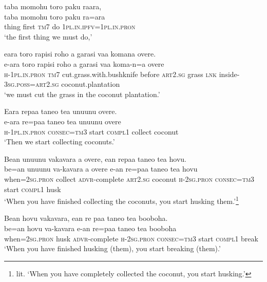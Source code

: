\ea\label{ex:text01-151}
taba momohu toro paku raara,\\
\gll taba	momohu	toro	paku	ra=ara\\
     thing	first	\textsc{tm}7	do	1\textsc{pl}.\textsc{in}.\textsc{ipfv}=1\textsc{pl}.\textsc{in}.\textsc{pron}\\
\glt `the first thing we must do,'
\z

\ea\label{ex:text01-152}
eara toro rapisi roho a garasi vaa komana overe.\\
\gll e-ara	toro	rapisi	roho	a	garasi	vaa	koma-n=a	overe\\
     \textsc{h}-1\textsc{pl}.\textsc{in}.\textsc{pron}	\textsc{tm}7	cut.grass.with.bushknife	before	\textsc{art}2.\textsc{sg}	grass	\textsc{lnk}	inside-3\textsc{sg}.\textsc{poss}=\textsc{art}2.\textsc{sg}	coconut.plantation\\
\glt `we must cut the grass in the coconut plantation.'
\z

\ea\label{ex:text01-153}
Eara repaa taneo tea unuunu overe.\\
\gll e-ara	re=paa	taneo	tea	unuunu	overe\\
     \textsc{h}-1\textsc{pl}.\textsc{in}.\textsc{pron}	\textsc{consec}=\textsc{tm}3	start	\textsc{compl}1	collect	coconut\\
\glt `Then we start collecting coconuts.'
\z

\ea\label{ex:text01-154}
Bean unuunu vakavara a overe, ean repaa taneo tea hovu.\\
\gll be=an	unuunu	va-kavara	a	overe	e-an	re=paa	taneo	tea	hovu\\
     when=2\textsc{sg}.\textsc{pron}	collect	\textsc{advr}-complete	\textsc{art}2.\textsc{sg}	coconut	\textsc{h}-2\textsc{sg}.\textsc{pron}	\textsc{consec}=\textsc{tm}3	start	\textsc{compl}1	husk\\
\glt `When you have finished collecting the coconuts, you start husking them.'\footnote{lit. `When you have completely collected the coconut, you start husking.'}
\z

\ea\label{ex:text01-155}
Bean hovu vakavara, ean re paa taneo tea booboha.\\
\gll be=an	hovu	va-kavara	e-an	re=paa	taneo	tea	booboha\\
     when=2\textsc{sg}.\textsc{pron}	husk	\textsc{advr}-complete	\textsc{h}-2\textsc{sg}.\textsc{pron}	\textsc{consec}=\textsc{tm}3	start	\textsc{compl}1	break\\
\glt `When you have finished husking (them), you start breaking (them).'
\z

